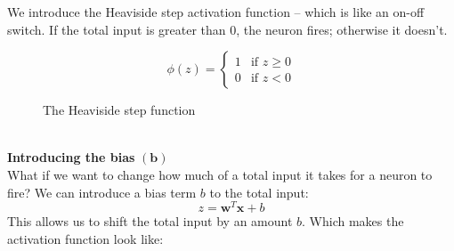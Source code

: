 \documentclass[9pt]{extarticle}
\begin{document}
We introduce the Heaviside step activation function – which is like an on-off switch. If the total input is greater than $0$, the neuron fires; otherwise it doesn't.
\begin{figure}[h]
    \centering
    \begin{subfigure}[c]{0.49\textwidth}
        \centering
        $$\phi(z) = \begin{cases}
                1 & \text{if } z \geq 0 \\
                0 & \text{if } z < 0
            \end{cases}
        $$
    \end{subfigure}
    \begin{subfigure}[c]{0.5\textwidth}
        \centering
    \end{subfigure}
    \caption{The Heaviside step function}
\end{figure} \\
\textbf{Introducing the bias} $\boldsymbol{(b)}$\\[2ex]
What if we want to change how much of a total input it takes for a neuron to fire? We can introduce a bias term $b$ to the total input:
$$z = \mathbf{w}^T \mathbf{x} + b$$
This allows us to shift the total input by an amount $b$. Which makes the activation function look like:
\end{document}
